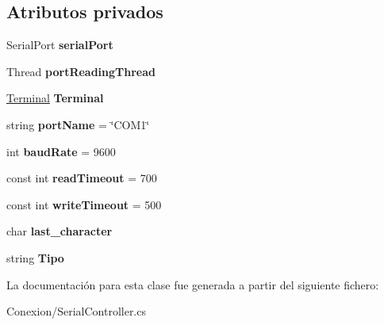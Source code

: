 \subsection*{Atributos privados}
\begin{DoxyCompactItemize}
\item 
\mbox{\label{class_serial_controller_ac209acf5fae32ccff498c6d0349f999b}} 
Serial\+Port {\bfseries serial\+Port}
\item 
\mbox{\label{class_serial_controller_aec57f1d1f3dc7cfc4161808fa22bdc0b}} 
Thread {\bfseries port\+Reading\+Thread}
\item 
\mbox{\label{class_serial_controller_a54863ac160f11e91f47e14a39a9abae7}} 
\mbox{\hyperlink{class_command_terminal_1_1_terminal}{Terminal}} {\bfseries Terminal}
\item 
\mbox{\label{class_serial_controller_afd06697d77f9bf30567820f957c5dca6}} 
string {\bfseries port\+Name} = \char`\"{}C\+O\+M1\char`\"{}
\item 
\mbox{\label{class_serial_controller_a96535d826c1065405c906c8a15f332bc}} 
int {\bfseries baud\+Rate} = 9600
\item 
\mbox{\label{class_serial_controller_a7c6efb78ecdd810eb56e5162a2d600e8}} 
const int {\bfseries read\+Timeout} = 700
\item 
\mbox{\label{class_serial_controller_a32bc9e356c0b88b37086b62a2db45c6d}} 
const int {\bfseries write\+Timeout} = 500
\item 
\mbox{\label{class_serial_controller_a0aef373369fb1951891e369e12432446}} 
char {\bfseries last\+\_\+character}
\item 
\mbox{\label{class_serial_controller_a472102a600c33bf8ae06a72878213217}} 
string {\bfseries Tipo}
\end{DoxyCompactItemize}


La documentación para esta clase fue generada a partir del siguiente fichero\+:\begin{DoxyCompactItemize}
\item 
Conexion/Serial\+Controller.\+cs\end{DoxyCompactItemize}
